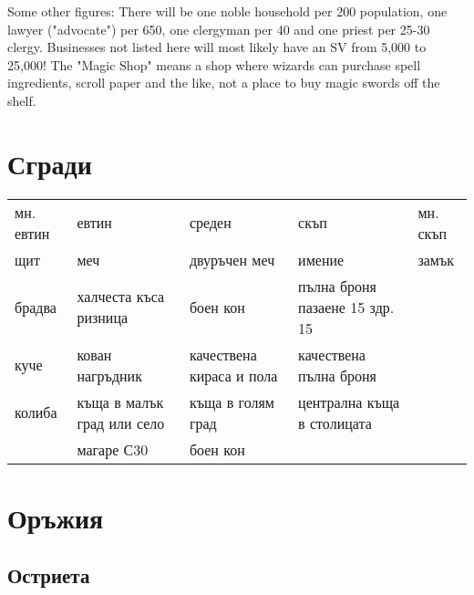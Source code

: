 Some other figures: There will be one noble household per 200 population, one lawyer ("advocate") per 650, one clergyman per 40 and one priest per 25-30 clergy. Businesses not listed here will most likely have an SV from 5,000 to 25,000! The "Magic Shop" means a shop where wizards can purchase spell ingredients, scroll paper and the like, not a place to buy magic swords off the shelf. 

\section{Сгради}
\begin{tabular}{p{3cm} | p{3cm} | p{3cm} | p{3cm} | p{3cm}}
мн. евтин & евтин                                   & среден                   & скъп                           & мн. скъп  \\
щит       & меч                                     & двуръчен меч             & имение                         & замък     \\
брадва    & халчеста къса ризница                   & боен кон                 & пълна броня пазаене 15 здр. 15 &           \\
куче      & кован нагръдник                         & качествена кираса и пола & качествена пълна броня         &           \\
колиба    & къща в малък град или село              & къща в голям град        & централна къща в столицата                 \\
          & магаре С30                              & боен кон                 &
\end{tabular}

\section{Оръжия}
\subsection{Остриета}

